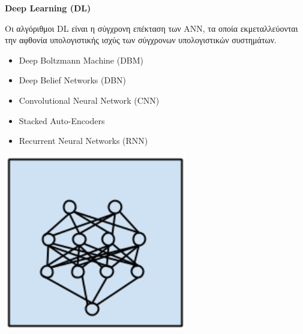 \begin{minipage}{0.5\textwidth}

  \textbf{\large Deep Learning (DL)}

  Οι αλγόριθμοι DL είναι η σύγχρονη επέκταση των ANN, τα οποία
  εκμεταλλεύονται την αφθονία υπολογιστικής ισχύς των σύγχρονων υπολογιστικών συστημάτων.
  \begin{itemize}
    \setlength\itemsep{0em}
    \item{Deep Boltzmann Machine (DBM)}
    \item{Deep Belief Networks (DBN)}
    \item{Convolutional Neural Network (CNN)}
    \item{Stacked Auto-Encoders}
    \item{Recurrent Neural Networks (RNN)}
  \end{itemize}%
\end{minipage}
\begin{minipage}{0.5\textwidth}
  \begin{center}
    \includegraphics[width=0.6\textwidth]{./images/chapter3/deep_learning_algorithms.png}
  \end{center}
\end{minipage}
\\\\

